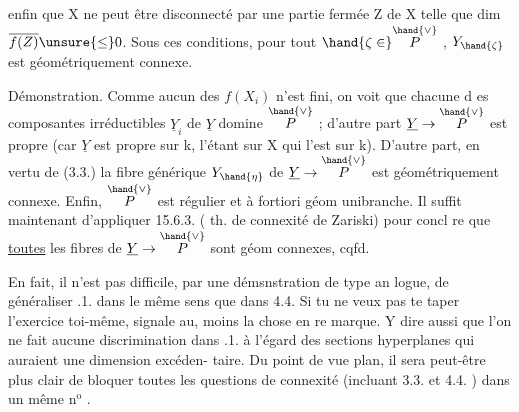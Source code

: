 enfin que X ne peut être disconnecté par une partie fermée Z de X telle
que dim $\overline{f(Z)} \unsure{\leq} 0$.    Sous ces conditions, pour tout $\hand{\zeta \in} \overset{\hand{\vee}}{P}$ , $Y_{\hand{\zeta}}$ est
géométriquement connexe.

Démonstration.  Comme  aucun des $f(X_i)$ n'est fini, on voit
que chacune d es composantes irréductibles $\underline{Y}_i$ de $\underline{Y}$ domine $\overset{\hand{\vee}}{P}$ ;
d'autre part $\underline{Y} \to \overset{\hand{\vee}}{P}$ est propre (car $\underline{Y}$ est propre sur k, l'étant sur X
qui l'est sur k).  D'autre part, en vertu de (3.3.) la fibre générique
$Y_{\hand{\eta}}$ de $\underline{Y} \to \overset{\hand{\vee}}{P}$ est géométriquement connexe. Enfin, $\overset{\hand{\vee}}{P}$ est régulier et
à fortiori géom unibranche. Il suffit maintenant d'appliquer 15.6.3.
( th. de connexité  de Zariski) pour concl
re que \uline{toutes} les fibres  de $\underline{Y} \to \overset{\hand{\vee}}{P}$ sont géom connexes, cqfd.

\margin{$|$} En fait,  il n'est pas difficile, par une démsnstration de type an
logue, de généraliser .1. dans le même sens que dans 4.4. Si tu ne
veux pas te taper l'exercice toi-même, signale au, moins la chose en re
marque. Y dire aussi que l'on ne fait aucune discrimination dans .1.
à l'égard des sections hyperplanes qui auraient une dimension excéden-%
\margin{$|$} taire.  Du point de vue plan, il sera peut-être plus clair de bloquer
toutes les questions de connexité (incluant 3.3. et 4.4. ) dans un
même n$^{\text{o}}$ .
